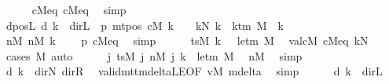 \begin{isabellebody}
\ \ \ \ \isamarkupfalse%
\ cM{}{\isacharunderscore}{\kern0pt}eq\ cM{\isacharunderscore}{\kern0pt}eq\ \isamarkupfalse%
\ simp\isanewline
\ \ \isamarkupfalse%
\ dposL{\isacharcolon}{\kern0pt}\ {\isachardoublequoteopen}d\ k\ {\isasymnoteq}\ dir{\isachardot}{\kern0pt}L{\isachardoublequoteclose}\ \ p{}{\isacharcolon}{\kern0pt}\ {\isachardoublequoteopen}mt{\isacharunderscore}{\kern0pt}pos\ cM\ k\ {\isacharequal}{\kern0pt}\ {}{\isachardoublequoteclose}\ \ kN{\isacharcolon}{\kern0pt}\ {\isachardoublequoteopen}k\ {\isacharless}{\kern0pt}\ k{\isacharunderscore}{\kern0pt}tm\ M{\isachardoublequoteclose}\ \ k\isanewline
\ \ \isamarkupfalse%
\ {\isacharminus}{\kern0pt}\isanewline
\ \ \ \ \isamarkupfalse%
\ nM{}{\isacharcolon}{\kern0pt}\ {\isachardoublequoteopen}nM\ k\ {\isacharequal}{\kern0pt}\ {}{\isachardoublequoteclose}\ \isamarkupfalse%
\ p{}\ cM{\isacharunderscore}{\kern0pt}eq\ \isamarkupfalse%
\ simp\isanewline
\ \ \ \ \isamarkupfalse%
\ {\isachardoublequoteopen}tsM\ k\ {}\ {\isacharequal}{\kern0pt}\ le{\isacharunderscore}{\kern0pt}tm\ M{\isachardoublequoteclose}\ \isamarkupfalse%
\ valcM\ cM{\isacharunderscore}{\kern0pt}eq\ kN\ \isamarkupfalse%
\ {\isacharparenleft}{\kern0pt}cases\ M{\isacharparenright}{\kern0pt}\ auto\isanewline
\ \ \ \ \isamarkupfalse%
\ {\isachardoublequoteopen}{\isacharparenleft}{\kern0pt}{\isasymlambda}j{\isachardot}{\kern0pt}\ tsM\ j\ {\isacharparenleft}{\kern0pt}nM\ j{\isacharparenright}{\kern0pt}{\isacharparenright}{\kern0pt}\ k\ {\isacharequal}{\kern0pt}\ le{\isacharunderscore}{\kern0pt}tm\ M{\isachardoublequoteclose}\ \isamarkupfalse%
\ nM{}\ \isamarkupfalse%
\ simp\isanewline
\ \ \ \ \isamarkupfalse%
\ {\isachardoublequoteopen}d\ k\ {\isasymin}\ {\isacharbraceleft}{\kern0pt}dir{\isachardot}{\kern0pt}N{\isacharcomma}{\kern0pt}\ dir{\isachardot}{\kern0pt}R{\isacharbraceright}{\kern0pt}{\isachardoublequoteclose}\ \isamarkupfalse%
\ valid{\isacharunderscore}{\kern0pt}mttm{\isacharunderscore}{\kern0pt}deltaLE{\isacharbrackleft}{\kern0pt}OF\ vM\ mdelta{\isacharbrackright}{\kern0pt}\ \isamarkupfalse%
\ simp\isanewline
\ \ \ \ \isamarkupfalse%
\ {\isachardoublequoteopen}d\ k\ {\isasymnoteq}\ dir{\isachardot}{\kern0pt}L{\isachardoublequoteclose}\ \isamarkupfalse%

\end{isabellebody}

